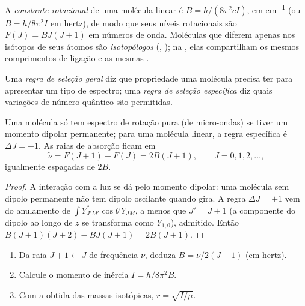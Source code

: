 \begin{definition}\label{def:b3:rovibrational-spectroscopy:rotational-constant}
A \emph{constante rotacional} de uma molécula linear
é $B = h/(8\pi^2cI)$, em \unit{cm^{-1}} (ou $B = h/8\pi^2I$ em hertz), de modo que
seus níveis rotacionais são $F(J) = BJ(J+1)$ em números de onda. Moléculas que
diferem apenas nos isótopos de seus átomos são \emph{isotopólogos}
(, ); na ,
elas compartilham os mesmos comprimentos de ligação e as mesmas .
\end{definition}

\begin{definition}\label{def:b3:rovibrational-spectroscopy:selection}
Uma \emph{regra de seleção geral} diz que
propriedade uma molécula precisa ter para apresentar um tipo de espectro; uma
\emph{regra de seleção específica} diz quais
variações de número quântico são permitidas.
\end{definition}

\begin{proposition}\label{prop:b3:rovibrational-spectroscopy:rotational-lines}
Uma molécula só tem espectro de rotação pura (de micro-ondas) se tiver um
momento dipolar permanente; para uma molécula linear, a regra específica é $\Delta J
= \pm1$. As raias de absorção ficam em
\[
\tilde\nu = F(J+1) - F(J) = 2B(J + 1), \qquad J = 0, 1, 2, \dots,
\]
igualmente espaçadas de $2B$.
\end{proposition}

\begin{proof}
A interação com a luz se dá pelo momento dipolar: uma molécula sem dipolo
permanente não tem dipolo oscilante quando gira. A regra $\Delta J
= \pm1$ vem do anulamento de $\int Y_{J'M'}^*\cos\theta\,Y_{JM}$, a menos que $J' = J
\pm 1$ (a componente do dipolo ao longo de $z$ se transforma como $Y_{1,0}$), admitido.
Então $B(J+1)(J+2) - BJ(J+1) = 2B(J+1)$.
\end{proof}

\begin{method}\label{met:b3:rovibrational-spectroscopy:bond-length}
\begin{enumerate}
  \item Da raia $J + 1 \leftarrow J$ de frequência $\nu$, deduza $B =
        \nu/2(J+1)$ (em hertz).
  \item Calcule o momento de inércia $I = h/8\pi^2B$.
  \item Com a  obtida das massas isotópicas, $r = \sqrt{I/\mu}$.
\end{enumerate}
\end{method}

